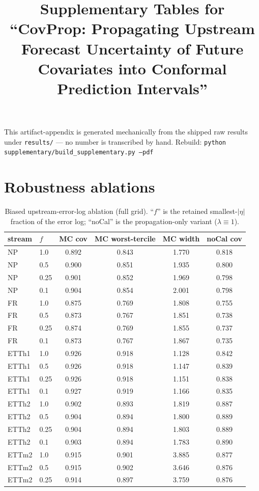 \documentclass[10pt]{article}
\title{Supplementary Tables for ``CovProp: Propagating Upstream Forecast
Uncertainty of Future Covariates into Conformal Prediction Intervals''}
\author{}
\date{}
\begin{document}
\maketitle
\noindent This artifact-appendix is generated mechanically from the shipped raw
results under \texttt{results/} --- no number is transcribed by hand.
Rebuild: \texttt{python supplementary/build\_supplementary.py --pdf}
\section{Robustness ablations}
\begin{table}[h]\centering\small
\caption{Biased upstream-error-log ablation (full grid). ``$f$'' is the retained smallest-$|\eta|$ fraction of the error log; ``noCal'' is the propagation-only variant ($\lambda\equiv 1$).}
\begin{tabular}{llcccc}
\toprule
stream & $f$ & MC cov & MC worst-tercile & MC width & noCal cov \\
\midrule
NP & 1.0 & 0.892 & 0.843 & 1.770 & 0.818 \\
NP & 0.5 & 0.900 & 0.851 & 1.935 & 0.800 \\
NP & 0.25 & 0.901 & 0.852 & 1.969 & 0.798 \\
NP & 0.1 & 0.904 & 0.854 & 2.001 & 0.798 \\
FR & 1.0 & 0.875 & 0.769 & 1.808 & 0.755 \\
FR & 0.5 & 0.873 & 0.767 & 1.851 & 0.738 \\
FR & 0.25 & 0.874 & 0.769 & 1.855 & 0.737 \\
FR & 0.1 & 0.873 & 0.767 & 1.867 & 0.735 \\
ETTh1 & 1.0 & 0.926 & 0.918 & 1.128 & 0.842 \\
ETTh1 & 0.5 & 0.926 & 0.918 & 1.147 & 0.839 \\
ETTh1 & 0.25 & 0.926 & 0.918 & 1.151 & 0.838 \\
ETTh1 & 0.1 & 0.927 & 0.919 & 1.166 & 0.835 \\
ETTh2 & 1.0 & 0.902 & 0.893 & 1.819 & 0.887 \\
ETTh2 & 0.5 & 0.904 & 0.894 & 1.800 & 0.889 \\
ETTh2 & 0.25 & 0.904 & 0.894 & 1.803 & 0.889 \\
ETTh2 & 0.1 & 0.903 & 0.894 & 1.783 & 0.890 \\
ETTm2 & 1.0 & 0.915 & 0.901 & 3.885 & 0.877 \\
ETTm2 & 0.5 & 0.915 & 0.902 & 3.646 & 0.876 \\
ETTm2 & 0.25 & 0.914 & 0.897 & 3.759 & 0.876 \\

\end{tabular}
\end{table}
\end{document}
